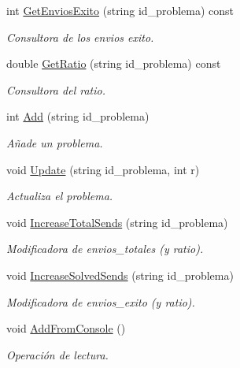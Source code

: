 \begin{DoxyCompactItemize}
int \mbox{\hyperlink{class_problem_set_aaf4917f4ebb7dc317ca91f1ecdbc2fe9}{Get\+Envios\+Exito}} (string id\+\_\+problema) const
\begin{DoxyCompactList}\small\item\em Consultora de los envios exito. \end{DoxyCompactList}\item 
double \mbox{\hyperlink{class_problem_set_aae2358d2149c1f703d97f2882ae2bec6}{Get\+Ratio}} (string id\+\_\+problema) const
\begin{DoxyCompactList}\small\item\em Consultora del ratio. \end{DoxyCompactList}\item 
int \mbox{\hyperlink{class_problem_set_ae41f8319bc9355824cf982879c7d0453}{Add}} (string id\+\_\+problema)
\begin{DoxyCompactList}\small\item\em Añade un problema. \end{DoxyCompactList}\item 
void \mbox{\hyperlink{class_problem_set_a80e552f84e64c3f03a92675927b8cae4}{Update}} (string id\+\_\+problema, int r)
\begin{DoxyCompactList}\small\item\em Actualiza el problema. \end{DoxyCompactList}\item 
void \mbox{\hyperlink{class_problem_set_aa0cbffad78647021f0c5c1deb3db2654}{Increase\+Total\+Sends}} (string id\+\_\+problema)
\begin{DoxyCompactList}\small\item\em Modificadora de envios\+\_\+totales (y ratio). \end{DoxyCompactList}\item 
void \mbox{\hyperlink{class_problem_set_a720c17f1bd3d8fd5628e0015ac734b07}{Increase\+Solved\+Sends}} (string id\+\_\+problema)
\begin{DoxyCompactList}\small\item\em Modificadora de envios\+\_\+exito (y ratio). \end{DoxyCompactList}\item 
void \mbox{\hyperlink{class_problem_set_adac211be4426d3b9395de055bbf43131}{Add\+From\+Console}} ()
\begin{DoxyCompactList}\small\item\em Operación de lectura. \end{DoxyCompactList}\item 

\end{DoxyCompactItemize}
